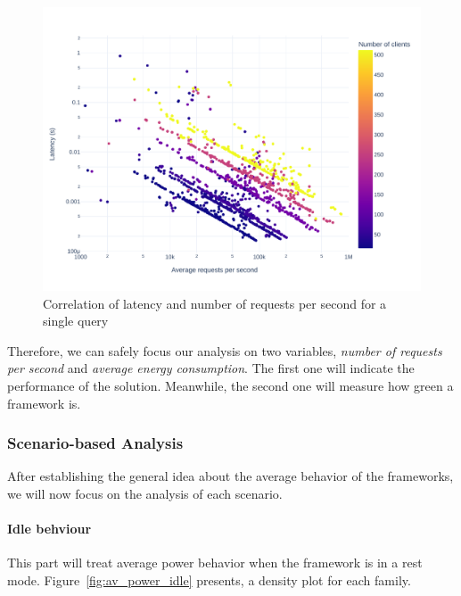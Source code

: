 \begin{figure}[!h]
    \centering
    \includegraphics[width=.9\columnwidth ]{imgs/scatter_db_latency_rps}
    \caption{Correlation of latency and number of requests per second for a single query}
    \label{fig:scatter_db}
\end{figure}

Therefore, we can safely focus our analysis on two variables, \emph{number of requests per second} and \emph{average energy consumption}. The first one will indicate the performance of the solution. Meanwhile, the second one will measure how green a framework is.







\subsubsection{Scenario-based Analysis}
After establishing the general idea about the average behavior of the frameworks, we will now focus on the analysis of each scenario.

\paragraph{Idle behviour}
This part will treat average power behavior when the framework is in a rest mode.
Figure~\ref{fig:av_power_idle} presents, a density plot for each family.

